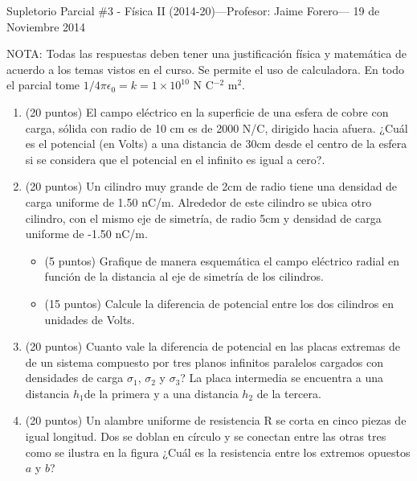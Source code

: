 \documentclass{article}
\begin{document}
\pagestyle{empty}
\noindent

\noindent
{\sc Supletorio Parcial \#3  - Física II (2014-20)---Profesor: Jaime Forero--- 19 de Noviembre 2014}

\vspace{1cm}

NOTA: Todas las respuestas deben tener una justificaci\'on f\'isica y
matem\'atica de acuerdo a los temas vistos en el curso. Se permite el
uso de calculadora. En todo el parcial tome
$1/4\pi\epsilon_0=k=1\times 10^{10}$ N C$^{-2}$ m$^{2}$. 

\begin{enumerate}
\item (20 puntos) El campo el\'ectrico en la superficie de una esfera
  de cobre con carga, s\'olida  con radio de 10 cm  es de 2000 N/C,
  dirigido hacia afuera. ¿Cuál es el potencial (en Volts) a una distancia
  de 30cm desde el centro de la esfera si se considera que el potencial
  en el infinito es igual a cero?. 

\item (20 puntos) Un cilindro muy grande de 2cm de radio tiene una
  densidad de carga uniforme de 1.50 nC/m. Alrededor de este cilindro
  se ubica otro cilindro, con el mismo eje de simetr\'ia, de radio 5cm
  y densidad de carga uniforme de  -1.50 nC/m. 

\begin{itemize}
\item (5 puntos) Grafique de manera esquem\'atica el campo el\'ectrico radial en funci\'on de la distancia al eje de simetr\'ia de los cilindros.
\item (15 puntos)
Calcule la diferencia de
  potencial entre los dos cilindros en unidades de Volts.
\end{itemize}

\item (20 puntos) Cuanto vale la diferencia de potencial en las placas
  extremas de de un sistema compuesto por tres planos infinitos
  paralelos cargados con densidades de carga $\sigma_1$, $\sigma_2$ y
  $\sigma_3$? La placa intermedia se encuentra a una distancia
  $h_1$de la primera y a una distancia $h_2$ de la tercera. 

\item (20 puntos) Un alambre uniforme de resistencia R se corta en
  cinco piezas de igual longitud. Dos se doblan en círculo y se
  conectan entre las otras tres como se ilustra en la figura ¿Cuál es
  la resistencia entre los  extremos opuestos $a$ y $b$?


\end{enumerate}
\end{document}
